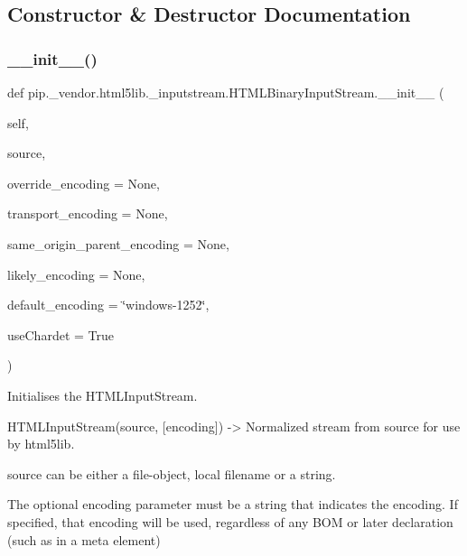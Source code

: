 \subsection{Constructor \& Destructor Documentation}
\mbox{\label{classpip_1_1__vendor_1_1html5lib_1_1__inputstream_1_1HTMLBinaryInputStream_a0ffa5c0b7956975f3ee09dab1b8a53bd}} 
\subsubsection{\texorpdfstring{\+\_\+\+\_\+init\+\_\+\+\_\+()}{\_\_init\_\_()}}
{\footnotesize\ttfamily def pip.\+\_\+vendor.\+html5lib.\+\_\+inputstream.\+H\+T\+M\+L\+Binary\+Input\+Stream.\+\_\+\+\_\+init\+\_\+\+\_\+ (\begin{DoxyParamCaption}\item[{}]{self,  }\item[{}]{source,  }\item[{}]{override\+\_\+encoding = {\ttfamily None},  }\item[{}]{transport\+\_\+encoding = {\ttfamily None},  }\item[{}]{same\+\_\+origin\+\_\+parent\+\_\+encoding = {\ttfamily None},  }\item[{}]{likely\+\_\+encoding = {\ttfamily None},  }\item[{}]{default\+\_\+encoding = {\ttfamily \char`\"{}windows-\/1252\char`\"{}},  }\item[{}]{use\+Chardet = {\ttfamily True} }\end{DoxyParamCaption})}

\begin{DoxyVerb}Initialises the HTMLInputStream.

HTMLInputStream(source, [encoding]) -> Normalized stream from source
for use by html5lib.

source can be either a file-object, local filename or a string.

The optional encoding parameter must be a string that indicates
the encoding.  If specified, that encoding will be used,
regardless of any BOM or later declaration (such as in a meta
element)\end{DoxyVerb}
 

